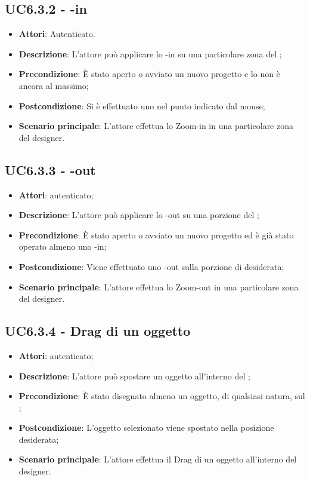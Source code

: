 \subsection{UC6.3.2 - -in}
\label{ssec:UC6.3.2}
\begin{itemize}
\item \textbf{Attori}:  Autenticato.
\item \textbf{Descrizione}: L'attore può applicare lo -in su una particolare zona del ;
\item \textbf{Precondizione}: È stato aperto o avviato un nuovo progetto e lo  non è ancora al massimo;
\item \textbf{Postcondizione}: Si è effettuato uno  nel punto indicato dal mouse;
\item \textbf{Scenario principale}: L'attore effettua lo Zoom-in in una particolare zona del designer.
\end{itemize}
\subsection{UC6.3.3 - -out}
\label{ssec:UC6.3.3}
\begin{itemize}
\item \textbf{Attori}:  autenticato;
\item \textbf{Descrizione}: L'attore può applicare lo -out su una porzione del ;
\item \textbf{Precondizione}: È stato aperto o avviato un nuovo progetto ed è già stato operato almeno uno -in;
\item \textbf{Postcondizione}: Viene effettuato uno -out sulla porzione di  desiderata;
\item \textbf{Scenario principale}: L'attore effettua lo Zoom-out in una particolare zona del designer.
\end{itemize}
\subsection{UC6.3.4 - Drag di un oggetto}
\label{ssec:UC6.3.4}
\begin{itemize}
\item \textbf{Attori}:  autenticato;
\item \textbf{Descrizione}: L'attore può spostare un oggetto all'interno del ;
\item \textbf{Precondizione}: È stato disegnato almeno un oggetto, di qualsiasi natura, sul ;
\item \textbf{Postcondizione}: L'oggetto selezionato viene spostato nella posizione desiderata;
\item \textbf{Scenario principale}: L'attore effettua il Drag di un oggetto all'interno del designer.
\end{itemize}
\newpage
